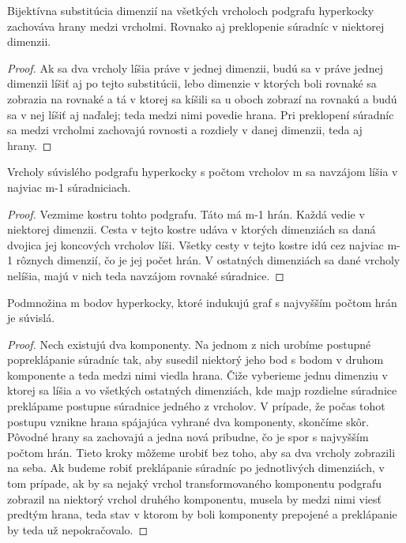 \begin{lem}
Bijektívna substitúcia dimenzií na všetkých vrcholoch podgrafu hyperkocky 
zachováva
hrany medzi vrcholmi. Rovnako aj preklopenie súradníc v niektorej dimenzii.
\end{lem}
\begin{proof}
Ak sa dva vrcholy líšia práve v jednej dimenzii, budú sa v práve jednej
dimenzii líšiť aj po tejto substitúcii, lebo dimenzie v ktorých boli rovnaké
sa zobrazia na rovnaké a tá v ktorej sa kíšili sa u oboch zobrazí na rovnakú
a budú sa v nej líšiť aj naďalej; teda medzi nimi povedie hrana.
Pri preklopení súradníc sa medzi vrcholmi zachovajú rovnosti a rozdiely v
danej dimenzii, teda aj hrany.
\end{proof}

\begin{lem}
Vrcholy súvislého podgrafu hyperkocky s počtom vrcholov m sa navzájom líšia
v najviac m-1 súradniciach.
\end{lem}

\begin{proof}
Vezmime kostru tohto podgrafu. Táto má m-1 hrán. Každá vedie v niektorej
dimenzii. Cesta v tejto kostre udáva v ktorých dimenziách sa daná dvojica
jej koncových vrcholov líši. Všetky cesty v tejto kostre idú cez najviac m-1
rôznych dimenzií, čo je jej počet hrán. V ostatných dimenziách sa dané
vrcholy nelíšia, majú v nich teda navzájom rovnaké súradnice.
\end{proof}

\begin{lem}
Podmnožina m bodov hyperkocky, ktoré indukujú graf s najvyšším počtom hrán je
súvislá.
\end{lem}

\begin{proof}
Nech existujú dva komponenty. Na jednom z nich urobíme 
postupné popreklápanie súradníc tak, aby susedil niektorý jeho bod s bodom
v druhom komponente a teda medzi nimi viedla hrana. Čiže vyberieme jednu
dimenziu v ktorej sa líšia a vo všetkých ostatných dimenziách, kde majp
rozdielne súradnice preklápame postupne súradnice jedného z vrcholov. 
V prípade, že počas tohot postupu vznikne hrana spájajúca vyhrané dva
komponenty, skončíme skôr. Pôvodné hrany sa
zachovajú a jedna nová pribudne, čo je spor s najvyšším počtom hrán.
Tieto kroky môžeme urobiť bez toho, aby sa dva vrcholy zobrazili na seba.
Ak budeme robiť preklápanie súradníc po jednotlivých dimenziách,
v tom prípade, ak by sa nejaký vrchol transformovaného komponentu
podgrafu zobrazil na niektorý vrchol druhého komponentu, musela by 
medzi nimi viesť predtým hrana, teda stav v ktorom by boli komponenty
prepojené a preklápanie by teda už nepokračovalo.
\end{proof}

